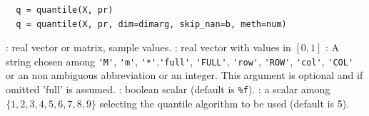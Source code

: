 
\begin{mandesc}
\end{mandesc}

\begin{calling_sequence}
\begin{verbatim}
  q = quantile(X, pr)
  q = quantile(X, pr, dim=dimarg, skip_nan=b, meth=num)  
\end{verbatim}
\end{calling_sequence}
\begin{parameters}
  \begin{varlist}
    : real vector or matrix, sample values.
    : real vector with values in $[0,1]$
    : A string chosen among \verb+'M'+, \verb+'m'+, \verb+'*'+,\verb+'full'+, \verb+'FULL'+, \verb+'row'+,
    \verb+'ROW'+, \verb+'col'+, \verb+'COL'+ or an non ambiguous abbreviation or an integer. 
    This argument is optional and if omitted 'full' is assumed.
    : boolean scalar (default is \verb+%f+).
    : a scalar among $\{1,2,3,4,5,6,7,8,9\}$ selecting the quantile algorithm to be used (default is 5).
  \end{varlist}
\end{parameters}

